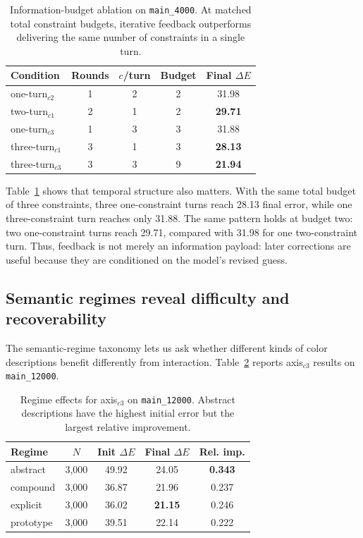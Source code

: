 \documentclass[11pt]{article}
\begin{document}
\begin{table}[t]
\centering
\small
\begin{tabular}{@{}lcccc@{}}
\toprule
\bf Condition & \bf Rounds & \bf $c$/turn & \bf Budget & \bf Final $\Delta E$ \\
\midrule
one-turn$_{c2}$ & 1 & 2 & 2 & 31.98 \\
two-turn$_{c1}$ & 2 & 1 & 2 & \textbf{29.71} \\
\midrule
one-turn$_{c3}$ & 1 & 3 & 3 & 31.88 \\
three-turn$_{c1}$ & 3 & 1 & 3 & \textbf{28.13} \\
\midrule
three-turn$_{c3}$ & 3 & 3 & 9 & \textbf{21.94} \\
\bottomrule
\end{tabular}
\caption{Information-budget ablation on \texttt{main\_4000}. At matched
total constraint budgets, iterative feedback outperforms delivering the same
number of constraints in a single turn.}
\label{tab:information_budget}
\end{table}

Table~\ref{tab:information_budget} shows that temporal structure also
matters. With the same total budget of three constraints, three
one-constraint turns reach 28.13 final error, while one three-constraint turn
reaches only 31.88. The same pattern holds at budget two: two
one-constraint turns reach 29.71, compared with 31.98 for one
two-constraint turn. Thus, feedback is not merely an information payload:
later corrections are useful because they are conditioned on the model's
revised guess.

\subsection{Semantic regimes reveal difficulty and recoverability}
\label{sec:results_regime}

The semantic-regime taxonomy lets us ask whether different kinds of color
descriptions benefit differently from interaction. Table~\ref{tab:regime_axis}
reports axis$_{c3}$ results on \texttt{main\_12000}.

\begin{table}[t]
\centering
\small
\begin{tabular}{@{}lcccc@{}}
\toprule
\bf Regime & \bf $N$ & \bf Init $\Delta E$ & \bf Final $\Delta E$ & \bf Rel. imp. \\
\midrule
abstract & 3,000 & 49.92 & 24.05 & \textbf{0.343} \\
compound & 3,000 & 36.87 & 21.96 & 0.237 \\
explicit & 3,000 & 36.02 & \textbf{21.15} & 0.246 \\
prototype & 3,000 & 39.51 & 22.14 & 0.222 \\
\bottomrule
\end{tabular}
\caption{Regime effects for axis$_{c3}$ on \texttt{main\_12000}. Abstract
descriptions have the highest initial error but the largest relative
improvement.}
\label{tab:regime_axis}
\end{table}
\end{document}
